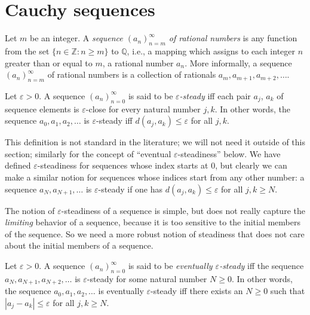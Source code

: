 \section{Cauchy sequences}

\begin{definition}[Sequences]\label{5.1.1}
Let \(m\) be an integer.
A \emph{sequence \((a_n)_{n = m}^{\infty}\) of rational numbers} is any function from the set \(\{n \in \mathds{Z} : n \geq m\}\) to \(\mathds{Q}\), i.e., a mapping which assigns to each integer \(n\) greater than or equal to \(m\), a rational number \(a_n\).
More informally, a sequence \((a_n)_{n = m}^{\infty}\) of rational numbers is a collection of rationals \(a_m, a_{m + 1}, a_{m + 2}, \dots\).
\end{definition}

\setcounter{theorem}{2}
\begin{definition}\label{5.1.3}
Let \(\varepsilon > 0\).
A sequence \((a_n)_{n = 0}^{\infty}\) is said to be \emph{\(\varepsilon\)-steady} iff each pair \(a_j\), \(a_k\) of sequence elements is \(\varepsilon\)-close for every natural number \(j, k\).
In other words, the sequence \(a_0, a_1, a_2, \dots\) is \(\varepsilon\)-steady iff \(d(a_j, a_k) \leq \varepsilon\) for all \(j, k\).
\end{definition}

\begin{remark}\label{5.1.4}
This definition is not standard in the literature;
we will not need it outside of this section;
similarly for the concept of ``eventual \(\varepsilon\)-steadiness'' below.
We have defined \(\varepsilon\)-steadiness for sequences whose index starts at \(0\), but clearly we can make a similar notion for sequences whose indices start from any other number:
a sequence \(a_N, a_{N + 1}, \dots\) is \(\varepsilon\)-steady if one has \(d(a_j, a_k) \leq \varepsilon\) for all \(j, k \geq N\).
\end{remark}

\begin{note}
The notion of \(\varepsilon\)-steadiness of a sequence is simple, but does not really capture the \emph{limiting} behavior of a sequence, because it is too sensitive to the initial members of the sequence.
So we need a more robust notion of steadiness that does not care about the initial members of a sequence.
\end{note}

\setcounter{theorem}{5}
\begin{definition}\label{5.1.6}
Let \(\varepsilon > 0\).
A sequence \((a_n)_{n = 0}^{\infty}\) is said to be \emph{eventually \(\varepsilon\)-steady} iff the sequence \(a_N, a_{N + 1}, a_{N + 2}, \dots\) is \(\varepsilon\)-steady for some natural number \(N \geq 0\).
In other words, the sequence \(a_0, a_1, a_2, \dots\) is eventually \(\varepsilon\)-steady iff there exists an \(N \geq 0\) such that \(|a_j - a_k| \leq \varepsilon\) for all \(j, k \geq N\).
\end{definition}

